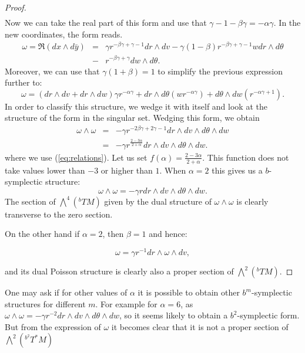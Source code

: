 \begin{proof}
\begin{equation}
\begin{array}{rcl}
\end{array}
\end{equation}
Now we can take the real part of this form and use that $\gamma - 1 - \beta\gamma = -\alpha\gamma$.
 In the new coordinates, the form reads.
\begin{equation}\label{eq:omegachanged}
\begin{array}{rcl}
\omega = \Re(dx \wedge d\bar{y}) & = & \gamma r^{-\beta\gamma + \gamma - 1} dr\wedge dv - \gamma(1 - \beta)r^{-\beta \gamma + \gamma -1}wdr\wedge d\theta \\
&-& r^{-\beta\gamma + \gamma} dw \wedge d\theta.
\end{array}
\end{equation}
Moreover, we can use that $\gamma(1+\beta) = 1$ to simplify the previous expression further to:
\begin{equation}
\omega = (dr\wedge dv + dr\wedge dw)\gamma r^{-\alpha\gamma} + dr\wedge d\theta(wr^{-\alpha\gamma}) + d\theta\wedge dw (r^{-\alpha\gamma + 1}).
\end{equation}
In order to classify this structure,  we wedge it with itself and look at the structure of the form in the singular set.
Wedging this form, we obtain
\begin{equation}
\begin{array}{rcl}
\omega\wedge \omega  & = &  -\gamma r^{-2\beta\gamma + 2\gamma - 1}dr\wedge dv \wedge d\theta\wedge dw\\
& = & \displaystyle -\gamma r^{\frac{2 -3\alpha}{2 + \alpha}}dr\wedge dv \wedge d\theta\wedge dw.
\end{array}
\end{equation}
where we use (\ref{eq:relations}). Let us set $f(\alpha) = \frac{2 -3\alpha}{2 + \alpha}$. This function does not take values lower than $-3$ or higher than $1$. 
When $\alpha = 2$ this gives us a $b$-symplectic structure:
$$\omega\wedge\omega = -\gamma r dr\wedge dv \wedge d\theta \wedge dw.$$
The section of $ \bigwedge^4(^bTM)$ given by the dual structure of $\omega\wedge\omega$ is clearly transverse to the zero section.

On the other hand if $\alpha = 2$, then $\beta = 1$ and hence:

$$\omega = \gamma r^{-1} dr\wedge \omega \wedge dv,$$

and its dual Poisson structure is clearly also a proper section of $ \bigwedge^2(^bTM)$.

\end{proof}

\begin{remark}
One may ask if for other values of $\alpha$ it is possible to obtain other $b^m$-symplectic structures for different $m$. For example for $\alpha = 6$,  as $\omega\wedge\omega = -\gamma r^{-2}dr\wedge dv \wedge d\theta \wedge dw$, so it seems likely to obtain a $b^2$-symplectic form. But from the expression of $\omega$ it becomes clear that it is not a proper section of $\bigwedge^2(^{b^2}T^*M)$
\end{remark}



